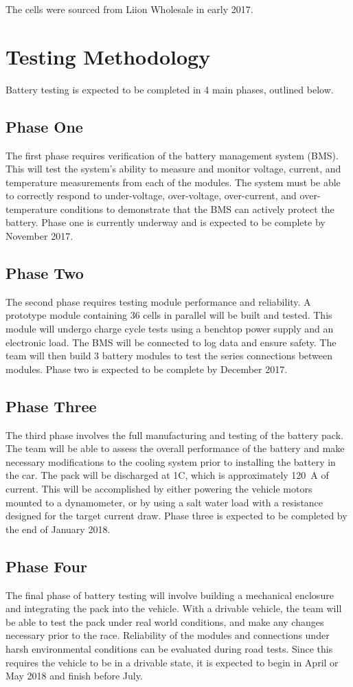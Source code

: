 \documentclass[10pt]{article}
\begin{document}
The cells were sourced from Liion Wholesale in early 2017.

\section{Testing Methodology}
Battery testing is expected to be completed in 4 main phases, outlined below.

\subsection{Phase One}
The first phase requires verification of the battery management system (BMS). This will test the system's ability to measure and monitor voltage, current, and temperature measurements from each of the modules. The system must be able to correctly respond to under-voltage, over-voltage, over-current, and over-temperature conditions to demonstrate that the BMS can actively protect the battery. Phase one is currently underway and is expected to be complete by November 2017. 

\subsection{Phase Two}
The second phase requires testing module performance and reliability. A prototype module containing 36 cells in parallel will be built and tested. This module will undergo charge cycle tests using a benchtop power supply and an electronic load. The BMS will be connected to log data and ensure safety. The team will then build 3 battery modules to test the series connections between modules. Phase two is expected to be complete by December 2017. 

\subsection{Phase Three}
The third phase involves the full manufacturing and testing of the battery pack. The team will be able to assess the overall performance of the battery and make necessary modifications to the cooling system prior to installing the battery in the car. The pack will be discharged at 1C, which is approximately \SI{120}{\ampere} of current. This will be accomplished by either powering the vehicle motors mounted to a dynamometer, or by using a salt water load with a resistance designed for the target current draw. Phase three is expected to be completed by the end of January 2018.

\subsection{Phase Four}
The final phase of battery testing will involve building a mechanical enclosure and integrating the pack into the vehicle. With a drivable vehicle, the team will be able to test the pack under real world conditions, and make any changes necessary prior to the race. Reliability of the modules and connections under harsh environmental conditions can be evaluated during road tests. Since this requires the vehicle to be in a drivable state, it is expected to begin in April or May 2018 and finish before July. 


\pagebreak
\appendix
\end{document}
